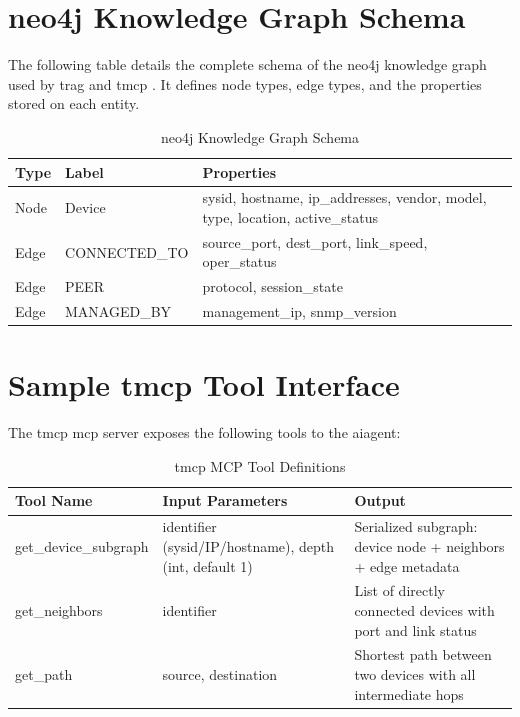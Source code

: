 \documentclass[11pt,a4paper]{report}
\begin{document}
\printglossaries

\appendix
\chapter{ \gls{neo4j}  Knowledge Graph Schema}

The following table details the complete schema of the  \gls{neo4j}  
knowledge graph used by  \gls{trag}  and  \gls{tmcp} . It defines node types, 
edge types, and the properties stored on each entity.

\begin{table}[H]
\centering
\caption{ \gls{neo4j}  Knowledge Graph Schema}
\small
\begin{tabular}{p{2.5cm} p{2.5cm} p{7cm}}
\toprule
\textbf{Type} & \textbf{Label} & \textbf{Properties} \\
\midrule
Node & Device & sysid, hostname, ip\_addresses, vendor, 
                model, type, location, active\_status \\[4pt]
Edge & CONNECTED\_TO & source\_port, dest\_port, link\_speed, 
                       oper\_status \\[4pt]
Edge & PEER & protocol, session\_state \\[4pt]
Edge & MANAGED\_BY & management\_ip, \gls{snmp}\_version \\
\bottomrule
\end{tabular}
\end{table}

\chapter{Sample  \gls{tmcp}  Tool Interface}

The  \gls{tmcp}  \gls{mcp}  server exposes the following tools to the \gls{ai}agent:

\begin{table}[H]
\centering
\caption{ \gls{tmcp}  MCP Tool Definitions}
\small
\begin{tabular}{p{3cm} p{3cm} p{6cm}}
\toprule
\textbf{Tool Name} & \textbf{Input Parameters} & \textbf{Output} \\
\midrule
get\_device\_subgraph & identifier (sysid/IP/hostname), 
                        depth (int, default 1) & 
                        Serialized subgraph: device node + 
                        neighbors + edge metadata \\[4pt]
get\_neighbors & identifier & 
                 List of directly connected devices 
                 with port and link status \\[4pt]
get\_path & source, destination & 
            Shortest path between two devices 
            with all intermediate hops \\
\bottomrule
\end{tabular}
\end{table}
\end{document}
